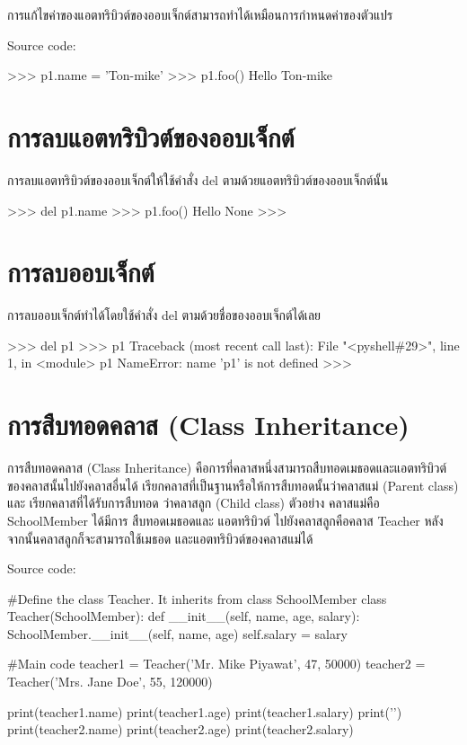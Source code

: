 การแก้ไขค่าของแอตทริบิวต์ของออบเจ็กต์สามารถทำได้เหมือนการกำหนดค่าของตัวแปร

Source code:
\begin{codelist}{}{}
>>> p1.name = 'Ton-mike'
>>> p1.foo()
Hello Ton-mike
\end{codelist}


\section{การลบแอตทริบิวต์ของออบเจ็กต์}

การลบแอตทริบิวต์ของออบเจ็กต์ให้ใช้คำสั่ง del ตามด้วยแอตทริบิวต์ของออบเจ็กต์นั้น
\begin{codelist}{}{}
>>> del p1.name
>>> p1.foo()
Hello None
>>> 
\end{codelist}

\section{การลบออบเจ็กต์}

การลบออบเจ็กต์ทำได้โดยใช้คำสั่ง del ตามด้วยชื่อของออบเจ็กต์ได้เลย

\begin{codelist}{}{}
>>> del p1
>>> p1
Traceback (most recent call last):
  File "<pyshell\#29>", line 1, in <module>
    p1
NameError: name 'p1' is not defined
>>> 
\end{codelist}

\section{การสืบทอดคลาส (Class Inheritance)}
การสืบทอดคลาส (Class Inheritance) คือการที่คลาสหนึ่งสามารถสืบทอดเมธอดและแอตทริบิวต์ ของคลาสนั้นไปยังคลาสอื่นได้ เรียกคลาสที่เป็นฐานหรือให้การสืบทอดนั้นว่าคลาสแม่ (Parent class) และ เรียกคลาสที่ได้รับการสืบทอด ว่าคลาสลูก (Child class) ตัวอย่าง คลาสแม่คือ SchoolMember ได้มีการ สืบทอดเมธอดและ แอตทริบิวต์ ไปยังคลาสลูกคือคลาส Teacher หลังจากนั้นคลาสลูกก็จะสามารถใช้เมธอด และแอตทริบิวต์ของคลาสแม่ได้

Source code:
\begin{codelist}{}{}
#Define the class Teacher. It inherits from class SchoolMember
class Teacher(SchoolMember):
    def __init__(self, name, age, salary):
        SchoolMember.__init__(self, name, age)
        self.salary = salary

#Main code
teacher1 = Teacher('Mr. Mike Piyawat', 47, 50000)
teacher2 = Teacher('Mrs. Jane Doe', 55, 120000)

print(teacher1.name)
print(teacher1.age)
print(teacher1.salary)
print('\n')
print(teacher2.name)
print(teacher2.age)
print(teacher2.salary)
\end{codelist}

